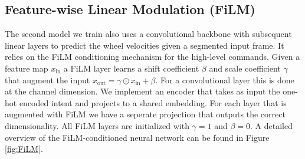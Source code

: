 \subsection{Feature-wise Linear Modulation (FiLM)}
\label{subsec:film}

The second model we train also uses a convolutional backbone with subsequent linear layers to predict the wheel velocities given a segmented input frame.
It relies on the FiLM \cite{Perez2017FiLMVR} conditioning mechanism for the high-level commands.
Given a feature map $x_{\text{in}}$ a FiLM layer learns a shift coefficient $\beta$ and scale coefficient $\gamma$ that augment the input $x_{\text{out}} = \gamma \odot x_{\text{in}} + \beta$.
For a convolutional layer this is done at the channel dimension.
We implement an encoder that takes as input the one-hot encoded intent and projects to a shared embedding.
For each layer that is augmented with FiLM we have a seperate projection that outputs the correct dimensionality.
All FiLM layers are initialized with $\gamma = 1$ and $\beta = 0$.
A detailed overview of the FiLM-conditioned neural network can be found in Figure \ref{fig:FiLM}.


